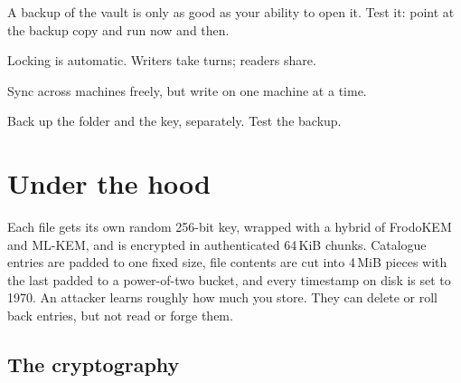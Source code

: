\documentclass[10pt,oneside,openany]{book}
\begin{document}

\begin{headsup}
A backup of the vault is only as good as your ability to open it. Test it:
point  at the backup copy and run  now and then.
\end{headsup}

\begin{pocket}
\begin{pocketlist}
  \item Locking is automatic. Writers take turns; readers share.
  \item Sync across machines freely, but write on one machine at a time.
  \item Back up the folder and the key, separately. Test the backup.
\end{pocketlist}
\end{pocket}

\chapter{Under the hood}

\begin{tldr}
Each file gets its own random 256-bit key, wrapped with a hybrid of FrodoKEM
and ML-KEM, and is encrypted in authenticated 64\,KiB chunks. Catalogue
entries are padded to one fixed size, file contents are cut into 4\,MiB
pieces with the last padded to a power-of-two bucket, and every timestamp on
disk is set to 1970. An attacker learns roughly how
much you store. They can delete or roll back entries, but not read or forge them.
\end{tldr}

\section{The cryptography}
\end{document}
